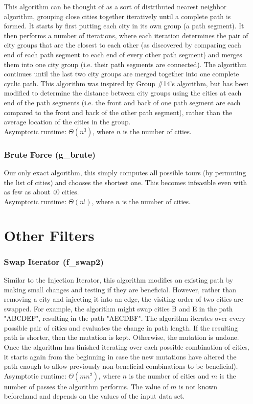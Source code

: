 \documentclass{article}
\begin{document}
This algorithm can be thought of as a sort of distributed nearest neighbor
algorithm, grouping close cities together iteratively until a complete path is
formed. It starts by first putting each city in its own group (a path segment).
It then performs a number of iterations, where each iteration determines the
pair of city groups that are the closest to each other (as discovered by
comparing each end of each path segment to each end of every other path
segment) and merges them into one city group (i.e. their path segments are
connected). The algorithm continues until the last two city groups are merged
together into one complete cyclic path.  This algorithm was inspired by Group
\#14's algorithm, but has been modified to determine the distance between city
groups using the cities at each end of the path segments (i.e. the front and
back of one path segment are each compared to the front and back of the other
path segment), rather than the average location of the cities in the group.
\\Asymptotic runtime: $\Theta (n^3)$, where $n$ is the number of cities.

\section*{Brute Force (g\_brute)}

Our only exact algorithm, this simply computes all possible tours (by permuting
the list of cities) and chooses the shortest one. This becomes infeasible even
with as few as about 40 cities.\\Asymptotic runtime: $\Theta (n!)$, where $n$
is the number of cities.

\part*{Other Filters}

\section*{Swap Iterator (f\_swap2)}

Similar to the Injection Iterator, this algorithm modifies an existing path by
making small changes and testing if they are beneficial. However, rather than
removing a city and injecting it into an edge, the visiting order of two cities
are swapped. For example, the algorithm might swap cities B and E in the path
"ABCDEF", resulting in the path "AECDBF". The algorithm iterates over every
possible pair of cities and evaluates the change in path length. If the
resulting path is shorter, then the mutation is kept. Otherwise, the mutation
is undone. Once the algorithm has finished iterating over each possible
combination of cities, it starts again from the beginning in case the new
mutations have altered the path enough to allow previously non-beneficial
combinations to be beneficial).\\Asymptotic runtime: $\Theta (mn^2)$, where $n$
is the number of cities and $m$ is the number of passes the algorithm performs.
The value of $m$ is not known beforehand and depends on the values of the input
data set.
\end{document}
